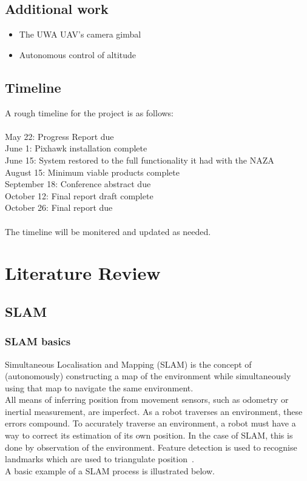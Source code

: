 \documentclass[a4paper, 12pt, titlepage]{article}
\begin{document}
  		
  		
  		\subsection{Additional work}
  		\begin{itemize}
  		 
  		\item The UWA UAV's camera gimbal
  		
  		\item Autonomous control of altitude
  		
  		\end{itemize}
  		
  		\subsection{Timeline}
  		A rough timeline for the project is as follows:
  		\\
  		\\May 22: Progress Report due
  		\\June 1: Pixhawk installation complete
  		\\June 15: System restored to the full functionality it had with the NAZA
  		\\August 15: Minimum viable products complete
  		\\September 18: Conference abstract due
  		\\October 12: Final report draft complete
  		\\October 26: Final report due
  		\\
  		\\The timeline will be monitered and updated as needed. 






\section{Literature Review}
	\subsection{SLAM}
	\subsubsection{SLAM basics}
	Simultaneous Localisation and Mapping (SLAM) is the concept of (autonomously) constructing a map of the environment while simultaneously using that map to navigate the same environment. 
	\\All means of inferring position from movement sensors, such as odometry or inertial measurement, are imperfect. As a robot traverses an environment, these errors compound. To accurately traverse an environment, a robot must have a way to correct its estimation of its own position. In the case of SLAM, this is done by observation of the environment. Feature detection is used to recognise landmarks which are used to triangulate position~\cite{Blas}.
	\\A basic example of a SLAM process is illustrated below. 
	
\end{document}
